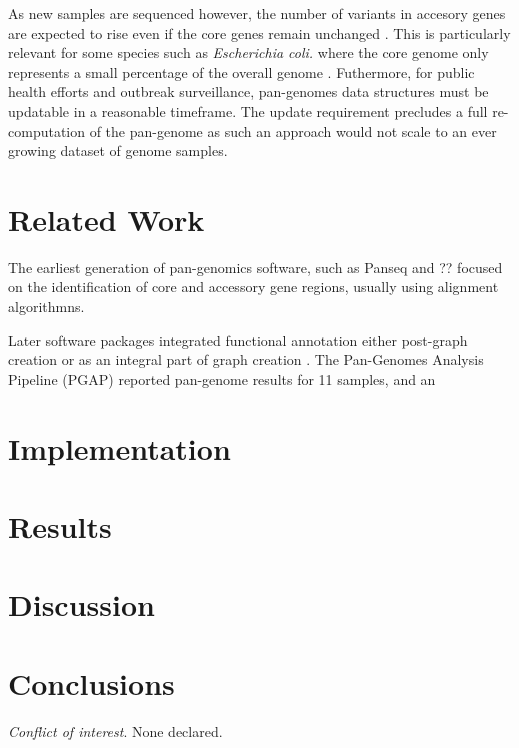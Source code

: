 \documentclass{article}
\begin{document}

As new samples are sequenced however, the number of variants in accesory genes are expected to rise even if the core genes remain unchanged \cite{medini2005microbial}.
This is particularly relevant for some species such as \textit{Escherichia coli.} where the core genome only represents a small percentage of the overall genome \cite{fukiya2004extensive}.
Futhermore, for public health efforts and outbreak surveillance, pan-genomes data structures must be updatable in a reasonable timeframe.
The update requirement precludes a full re-computation of the pan-genome as such an approach would not scale to an ever growing dataset of genome samples.


\enlargethispage{-65.1pt}

\section{Related Work}

The earliest generation of pan-genomics software, such as Panseq \cite{} and ?? \cite{} focused on the identification of core and accessory gene regions, usually using alignment algorithmns.

Later software packages integrated functional annotation either post-graph creation \cite{zhao2011pgap} or as an integral part of graph creation \cite{page2015roary}.
The Pan-Genomes Analysis Pipeline (PGAP) \cite{zhao2011pgap} reported pan-genome results for 11 samples, and an 


\section{Implementation}

\section{Results}

\section{Discussion}


\section{Conclusions}


\textit{Conflict of interest}. None declared.

\newpage



\end{document}
